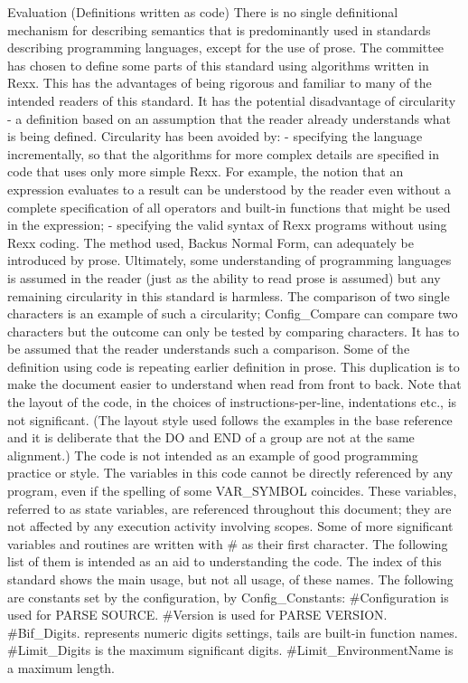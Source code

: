 Evaluation (Definitions written as code) There is no single definitional
mechanism for describing semantics that is predominantly used in
standards describing programming languages, except for the use of prose.
The committee has chosen to define some parts of this standard using
algorithms written in Rexx. This has the advantages of being rigorous
and familiar to many of the intended readers of this standard. It has
the potential disadvantage of circularity - a definition based on an
assumption that the reader already understands what is being defined.
Circularity has been avoided by: - specifying the language
incrementally, so that the algorithms for more complex details are
specified in code that uses only more simple Rexx. For example, the
notion that an expression evaluates to a result can be understood by the
reader even without a complete specification of all operators and
built-in functions that might be used in the expression; - specifying
the valid syntax of Rexx programs without using Rexx coding. The method
used, Backus Normal Form, can adequately be introduced by prose.
Ultimately, some understanding of programming languages is assumed in
the reader (just as the ability to read prose is assumed) but any
remaining circularity in this standard is harmless. The comparison of
two single characters is an example of such a circularity;
Config\_Compare can compare two characters but the outcome can only be
tested by comparing characters. It has to be assumed that the reader
understands such a comparison. Some of the definition using code is
repeating earlier definition in prose. This duplication is to make the
document easier to understand when read from front to back. Note that
the layout of the code, in the choices of instructions-per-line,
indentations etc., is not significant. (The layout style used follows
the examples in the base reference and it is deliberate that the DO and
END of a group are not at the same alignment.) The code is not intended
as an example of good programming practice or style. The variables in
this code cannot be directly referenced by any program, even if the
spelling of some VAR\_SYMBOL coincides. These variables, referred to as
state variables, are referenced throughout this document; they are not
affected by any execution activity involving scopes. Some of more
significant variables and routines are written with \# as their first
character. The following list of them is intended as an aid to
understanding the code. The index of this standard shows the main usage,
but not all usage, of these names. The following are constants set by
the configuration, by Config\_Constants: \#Configuration is used for
PARSE SOURCE. \#Version is used for PARSE VERSION. \#Bif\_Digits.
represents numeric digits settings, tails are built-in function names.
\#Limit\_Digits is the maximum significant digits.
\#Limit\_EnvironmentName is a maximum length.

